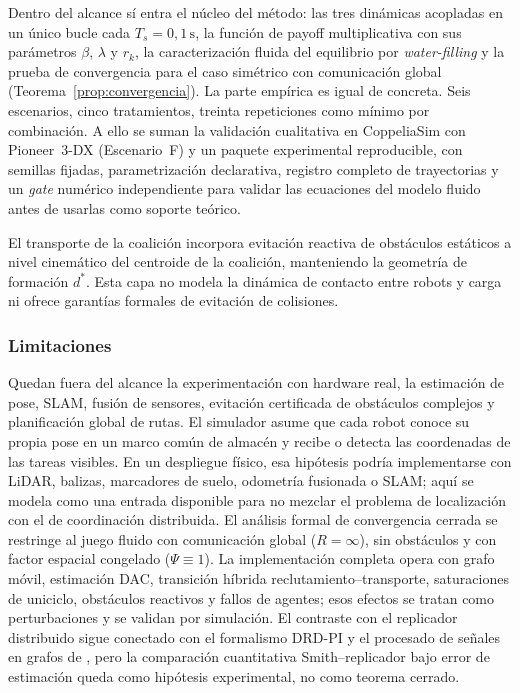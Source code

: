 Dentro del alcance sí entra el núcleo del método: las tres dinámicas acopladas en un
único bucle cada $T_s = 0{,}1\,\text{s}$, la función de payoff multiplicativa con sus
parámetros $\beta$, $\lambda$ y $r_k$, la caracterización fluida del equilibrio por
\emph{water-filling} y la prueba de convergencia para el caso simétrico con comunicación
global (Teorema~\ref{prop:convergencia}). La parte empírica es igual de concreta. Seis
escenarios, cinco tratamientos, treinta repeticiones como mínimo por combinación. A ello
se suman la validación cualitativa en CoppeliaSim con Pioneer~3-DX (Escenario~F) y un
paquete experimental reproducible, con semillas fijadas, parametrización declarativa,
registro completo de trayectorias y un \emph{gate} numérico independiente para validar
las ecuaciones del modelo fluido antes de usarlas como soporte teórico.

El transporte de la coalición incorpora evitación reactiva de obstáculos estáticos a
nivel cinemático del centroide de la coalición, manteniendo la geometría de formación
$d^*$. Esta capa no modela la dinámica de contacto entre robots y carga ni ofrece
garantías formales de evitación de colisiones.

\subsubsection{Limitaciones}

Quedan fuera del alcance la experimentación con hardware real, la estimación de pose,
SLAM, fusión de sensores, evitación certificada de obstáculos complejos y planificación
global de rutas. El simulador asume que cada robot conoce su propia pose en un marco
común de almacén y recibe o detecta las coordenadas de las tareas visibles. En un
despliegue físico, esa hipótesis podría implementarse con LiDAR, balizas, marcadores de
suelo, odometría fusionada o SLAM; aquí se modela como una entrada disponible para no
mezclar el problema de localización con el de coordinación distribuida.
El análisis formal de convergencia cerrada se restringe al juego fluido con
comunicación global ($R = \infty$), sin obstáculos y con factor espacial congelado
($\Psi\equiv1$). La implementación completa opera con grafo móvil, estimación DAC,
transición híbrida reclutamiento--transporte, saturaciones de uniciclo, obstáculos
reactivos y fallos de agentes; esos efectos se tratan como perturbaciones y se validan
por simulación. El contraste con el replicador distribuido sigue conectado con el
formalismo DRD-PI y el procesado de señales en grafos de \citet{sandryhaila2013dsp},
pero la comparación cuantitativa Smith--replicador bajo error de estimación queda como
hipótesis experimental, no como teorema cerrado.

